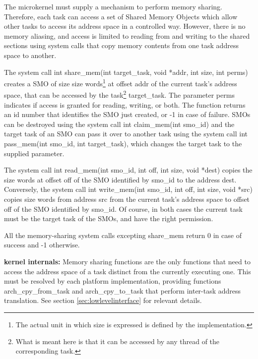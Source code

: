 \documentclass[11pt, letterpaper, twoside, english]{book}
\begin{document}
The microkernel must supply a mechanism to perform memory sharing. Therefore, each task can access a set of Shared Memory Objects which allow other tasks to access its address space in a controlled way. However, there is no memory aliasing, and access is limited to reading from and writing to the shared sections using system calls that copy memory contents from one task address space to another.

The system call \textsf{int share\_mem(int target\_task, void *addr, int size, int perms)} creates a SMO of size \textsf{size} words\footnote{The actual unit in which size is expressed is defined by the implementation.} at offset \textsf{addr} of the current task's address space, that can be accessed by the task\footnote{What is meant here is that it can be accessed by any thread of the corresponding task.} \textsf{target\_task}. The parameter \textsf{perms} indicates if access is granted for reading, writing, or both. The function returns an id number that identifies the SMO just created, or -1 in case of failure. SMOs can be destroyed using the system call \textsf{int claim\_mem(int smo\_id)} and the target task of an SMO can pass it over to another task using the system call \textsf{int pass\_mem(int smo\_id, int target\_task)}, which changes the target task to the supplied parameter.

The system call \textsf{int read\_mem(int smo\_id, int off, int size, void *dest)} copies the \textsf{size} words at offset \textsf{off} of the SMO identified by \textsf{smo\_id} to the address \textsf{dest}. Conversely, the system call \textsf{int write\_mem(int smo\_id, int off, int size, void *src)} copies \textsf{size} words from address \textsf{src} from the current task's address space to offset \textsf{off} of the SMO identified by \textsf{smo\_id}. Of course, in both cases the current task must be the target task of the SMOs, and have the right permission.

All the memory-sharing system calls excepting \textsf{share\_mem} return 0 in case of success and -1 otherwise.

\textbf{kernel internals:} Memory sharing functions are the only functions that need to access the address space of a task distinct from the currently executing one. This must be resolved by each platform implementation, providing functions \textsf{arch\_cpy\_from\_task} and \textsf{arch\_cpy\_to\_task} that perform inter-task address translation. See section \ref{sec:lowlevelinterface} for relevant details.
\end{document}
